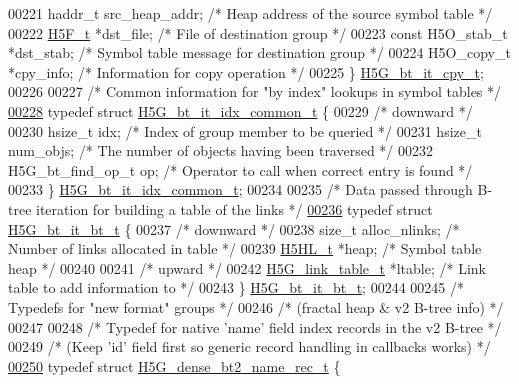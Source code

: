 \begin{DoxyCode}
00221     haddr\_t     src\_heap\_addr;  \textcolor{comment}{/* Heap address of the source symbol table  */}
00222     \hyperlink{struct_h5_f__t}{H5F\_t}       *dst\_file;      \textcolor{comment}{/* File of destination group */}
00223     \textcolor{keyword}{const} H5O\_stab\_t *dst\_stab; \textcolor{comment}{/* Symbol table message for destination group */}
00224     H5O\_copy\_t  *cpy\_info;      \textcolor{comment}{/* Information for copy operation */}
00225 \} \hyperlink{struct_h5_g__bt__it__cpy__t}{H5G\_bt\_it\_cpy\_t};
00226 
00227 \textcolor{comment}{/* Common information for "by index" lookups in symbol tables */}
\hyperlink{struct_h5_g__bt__it__idx__common__t}{00228} \textcolor{keyword}{typedef} \textcolor{keyword}{struct }\hyperlink{struct_h5_g__bt__it__idx__common__t}{H5G\_bt\_it\_idx\_common\_t} \{
00229     \textcolor{comment}{/* downward */}
00230     hsize\_t     idx;            \textcolor{comment}{/* Index of group member to be queried */}
00231     hsize\_t     num\_objs;       \textcolor{comment}{/* The number of objects having been traversed */}
00232     H5G\_bt\_find\_op\_t op;        \textcolor{comment}{/* Operator to call when correct entry is found */}
00233 \} \hyperlink{struct_h5_g__bt__it__idx__common__t}{H5G\_bt\_it\_idx\_common\_t};
00234 
00235 \textcolor{comment}{/* Data passed through B-tree iteration for building a table of the links */}
\hyperlink{struct_h5_g__bt__it__bt__t}{00236} \textcolor{keyword}{typedef} \textcolor{keyword}{struct }\hyperlink{struct_h5_g__bt__it__bt__t}{H5G\_bt\_it\_bt\_t} \{
00237     \textcolor{comment}{/* downward */}
00238     \textcolor{keywordtype}{size\_t} alloc\_nlinks;        \textcolor{comment}{/* Number of links allocated in table */}
00239     \hyperlink{struct_h5_h_l__t}{H5HL\_t} *heap;               \textcolor{comment}{/* Symbol table heap */}
00240 
00241     \textcolor{comment}{/* upward */}
00242     \hyperlink{struct_h5_g__link__table__t}{H5G\_link\_table\_t} *ltable;   \textcolor{comment}{/* Link table to add information to */}
00243 \} \hyperlink{struct_h5_g__bt__it__bt__t}{H5G\_bt\_it\_bt\_t};
00244 
00245 \textcolor{comment}{/* Typedefs for "new format" groups */}
00246 \textcolor{comment}{/* (fractal heap & v2 B-tree info) */}
00247 
00248 \textcolor{comment}{/* Typedef for native 'name' field index records in the v2 B-tree */}
00249 \textcolor{comment}{/* (Keep 'id' field first so generic record handling in callbacks works) */}
\hyperlink{struct_h5_g__dense__bt2__name__rec__t}{00250} \textcolor{keyword}{typedef} \textcolor{keyword}{struct }\hyperlink{struct_h5_g__dense__bt2__name__rec__t}{H5G\_dense\_bt2\_name\_rec\_t} \{

\end{DoxyCode}
